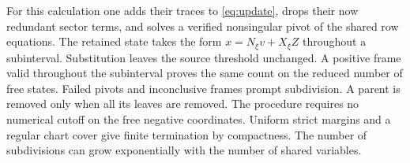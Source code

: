 For this calculation one adds their traces to \eqref{eq:update}, drops their now redundant sector terms, and solves a verified nonsingular pivot of the shared row equations. The retained state takes the form $x=N_\xi v+X_\xi Z$ throughout a subinterval. Substitution leaves the source threshold unchanged. A positive frame valid throughout the subinterval proves the same count on the reduced number of free states. Failed pivots and inconclusive frames prompt subdivision. A parent is removed only when all its leaves are removed. The procedure requires no numerical cutoff on the free negative coordinates. Uniform strict margins and a regular chart cover give finite termination by compactness. The number of subdivisions can grow exponentially with the number of shared variables.
